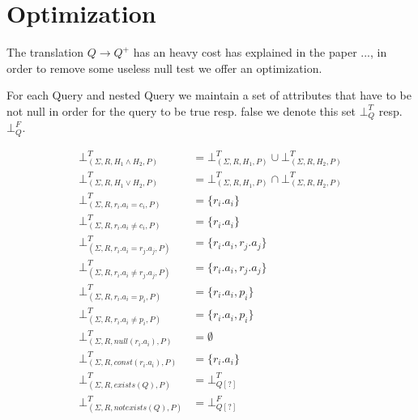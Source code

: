 \section{Optimization}
The translation $Q \rightarrow Q^+$ has an heavy cost has explained in the paper ..., in order to remove some useless null test we offer an optimization.

\begin{mydef}
	For each Query and nested Query we maintain a set of attributes that have to be not null in order for the query to be true resp. false we denote this set $\bot^T_{Q}$ resp.$\bot^F_{Q}$.
\end{mydef} 

\begin{mydef}
	\begin{align*}
		\bot^T_{(\Sigma,R,H_1 \land H_2,P)} & = \bot^T_{(\Sigma,R,H_1,P)} \cup \bot^T_{(\Sigma,R,H_2,P)} \\
		\bot^T_{(\Sigma,R,H_1 \lor H_2,P)} & = \bot^T_{(\Sigma,R,H_1,P)} \cap \bot^T_{(\Sigma,R,H_2,P)} \\
		\bot^T_{(\Sigma,R,r_i.a_i = c_i,P)} & = \{r_i.a_i\} \\
		\bot^T_{(\Sigma,R,r_i.a_i \neq c_i,P)} & = \{r_i.a_i\} \\
		\bot^T_{(\Sigma,R,r_i.a_i = r_j.a_j,P)} & = \{r_i.a_i,r_j.a_j\} \\
		\bot^T_{(\Sigma,R,r_i.a_i \neq r_j.a_j,P)} & = \{r_i.a_i,r_j.a_j\} \\
		\bot^T_{(\Sigma,R,r_i.a_i = p_i,P)} & = \{r_i.a_i,p_i\} \\
		\bot^T_{(\Sigma,R,r_i.a_i \neq p_i,P)} & = \{r_i.a_i,p_i\} \\
		\bot^T_{(\Sigma,R,null(r_i.a_i),P)} & = \emptyset \\
		\bot^T_{(\Sigma,R,const(r_i.a_i),P)} & = \{r_i.a_i\} \\
		\bot^T_{(\Sigma,R,exists(Q),P)} & = \bot^T_{Q[?]} \\
		\bot^T_{(\Sigma,R,notexists(Q),P)} & = \bot^F_{Q[?]}\\
	\end{align*}
	

\end{mydef}

